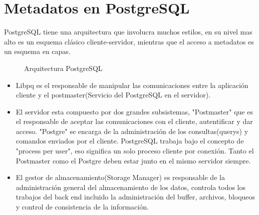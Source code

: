 \section{Metadatos en PostgreSQL}
PostgreSQL tiene una arquitectura que involucra muchos estilos, en su nivel mas alto es un esquema cl\'asico cliente-servidor, mientras que el acceso a metadatos es un esquema en capas.
\begin{figure}[H]
\centering
{}
\caption{Arquitectura PostgreSQL \cite{postgresqlpordentro}} \label{fig:ArquitecturaPostgres}
\end{figure}
\begin{itemize}
\item Libpq es el responsable de manipular las comunicaciones entre la aplicaci\'on cliente y el postmaster(Servicio del PostgreSQL en el servidor).
\item El servidor esta compuesto por dos grandes subsistemas, "Postmaster" que es el responsable de aceptar las comunicaciones con el cliente, autentificar y dar acceso. "Postgre" se encarga de la administraci\'on de los consultas(querys) y comandos enviados por el cliente. PostgreSQL trabaja bajo el concepto de "process per user", eso significa un solo proceso cliente por conexi\'on. Tanto el Postmaster como el Postgre deben estar junto en el mismo servidor siempre.
\item El gestor de almacenamiento(Storage Manager) es responsable de la administraci\'on general del almacenamiento de los datos, controla todos los trabajos del back end incluido la administraci\'on del buffer, archivos, bloqueos y control de consistencia de la informaci\'on.   
\end{itemize}
